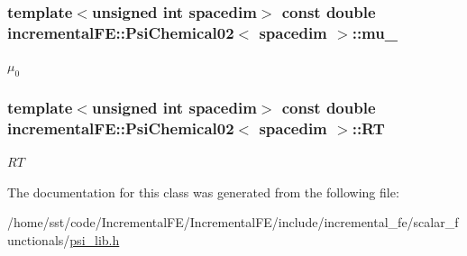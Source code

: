 \subsubsection[{\texorpdfstring{mu\+\_\+0}{mu_0}}]{\setlength{\rightskip}{0pt plus 5cm}template$<$unsigned int spacedim$>$ const double {\bf incremental\+F\+E\+::\+Psi\+Chemical02}$<$ spacedim $>$\+::mu\+\_\hspace{0.3cm}{\ttfamily [private]}}\hypertarget{classincremental_f_e_1_1_psi_chemical02_a70426dc3fa6acda53984c2e178ad92c5}{}\label{classincremental_f_e_1_1_psi_chemical02_a70426dc3fa6acda53984c2e178ad92c5}
$\mu_0$ 
\subsubsection[{\texorpdfstring{RT}{RT}}]{\setlength{\rightskip}{0pt plus 5cm}template$<$unsigned int spacedim$>$ const double {\bf incremental\+F\+E\+::\+Psi\+Chemical02}$<$ spacedim $>$\+::RT\hspace{0.3cm}{\ttfamily [private]}}\hypertarget{classincremental_f_e_1_1_psi_chemical02_a4b93e968af97d8497a53be13980ef22e}{}\label{classincremental_f_e_1_1_psi_chemical02_a4b93e968af97d8497a53be13980ef22e}
$RT$ 

The documentation for this class was generated from the following file\+:\begin{DoxyCompactItemize}
\item 
/home/sst/code/\+Incremental\+F\+E/\+Incremental\+F\+E/include/incremental\+\_\+fe/scalar\+\_\+functionals/\hyperlink{psi__lib_8h}{psi\+\_\+lib.\+h}\end{DoxyCompactItemize}
